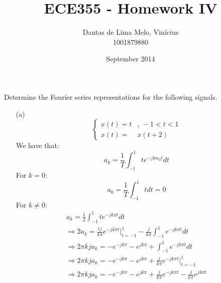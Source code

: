 \documentclass{article}
\title{ECE355 - Homework IV}
\author{Dantas de Lima Melo, Vinícius \\ \small{1001879880}}
\date{September 2014}
\begin{document}
\maketitle

\setcounter{section}{2}
\section{}
    \setcounter{subsection}{21}
    \subsection{} Determine the Fourier series representations for the following signals.
    \begin{enumerate}
        \item[(a)]
            \begin{equation*}
                \left\{\begin{array}{rl}
                    x(t)=t&\textrm{, } -1 < t < 1  \\
                    x(t)= &x(t+2)
                \end{array}\right.
            \end{equation*}
            We have that:
            \begin{equation} \label{eq:1.23a1}
                a_{k} = \frac{1}{T}\int_{-1}^{1} te^{-jkw_{0}t}dt 
            \end{equation}
            For $k = 0$:
            \begin{equation*}
                a_{0} = \frac{1}{T}\int_{-1}^{1}tdt = 0
            \end{equation*}
            For $k\neq 0$:
            \begin{equation*}
                \begin{array}{l}
                    a_{k} = \frac{1}{2}\int_{-1}^{1} te^{-jk\pi t}dt \\
                    \Rightarrow 2a_{k} = \frac{tj}{k\pi}e^{-jk\pi t}\biggl|_{t=-1}^{1} - \frac{j}{k\pi}\int_{-1}^{1}e^{-jk\pi t}dt \\                     \Rightarrow 2\pi kja_{k} = -e^{-jk\pi}-e^{jk\pi} + \int_{-1}^{1}e^{-jk\pi t}dt \\
                    \Rightarrow 2\pi kja_{k} = -e^{-jk\pi}-e^{jk\pi} + \frac{j}{k\pi}e^{-jk\pi t}\biggl|_{t=-1}^{1} \\
                    \Rightarrow 2\pi kja_{k} = -e^{-jk\pi}-e^{jk\pi} + \frac{j}{k\pi}e^{-jk\pi t}-\frac{j}{k\pi}e^{jk\pi t} \\

\end{array}
\end{equation*}
\end{enumerate}
\end{document}
